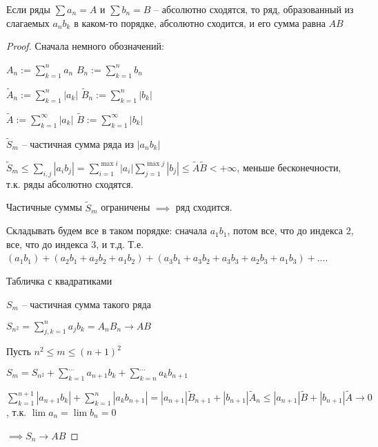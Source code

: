 \begin{theorem}[Коши] \thmslashn
	
	Если ряды $\sum a_n = A$ и $\sum b_n = B$ -- абсолютно сходятся, то ряд, образованный из слагаемых $a_nb_k$ в каком-то порядке, абсолютно сходится, и его сумма равна $AB$
\end{theorem}

\begin{proof} \thmslashn
	
	Сначала немного обозначений:

	$A_n := \sum\limits_{k = 1}^{n} a_n$ $B_n:= \sum\limits_{k=1}^{n}b_n$
	
	$\tilde{A}_n := \sum\limits_{k = 1}^{n}\left|a_k\right|$ $\tilde{B}_n := \sum\limits_{k=1}^{n}\left|b_k\right|$
	
	$\tilde{A} := \sum\limits_{k = 1}^{\infty}\left|a_k\right|$ $\tilde{B} := \sum\limits_{k=1}^{\infty}\left|b_k\right|$
	
	
	$\tilde{S}_m$ -- частичная сумма ряда из $\left|a_nb_k\right|$
	
	$\tilde{S}_m \le \sum\limits_{i, j} \left|a_ib_j\right| = \sum\limits_{i = 1}^{\max{i}}\left|a_i\right|\sum\limits_{j = 1}^{\max{j}}\left|b_j\right| \le \tilde{A}\tilde{B} < +\infty$, меньше бесконечности, т.к. ряды абсолютно сходятся.
	
	Частичные суммы $\tilde{S}_m$ ограничены $\implies $ ряд сходится.
	
	Складывать будем все в таком порядке: сначала $a_1b_1$, потом все, что до индекса $2$, все, что до индекса $3$, и т.д. Т.е. $(a_1b_1) + (a_2b_1 + a_2b_2 + a_1b_2) + (a_3b_1 + a_3b_2 + a_3b_3 + a_2b_3 + a_1b_3) + ...$.
	
	\TODO Табличка с квадратиками 
	
	$S_m$ -- частичная сумма такого ряда
	
	$S_{n^2} = \sum\limits_{j,k=1}^{n} a_j b_k = A_n B_n \to AB$
	
	Пусть $n^2 \le m \le (n+1)^2$
	
	$S_m = S_{n^2} + \sum\limits_{k=1}^{...}a_{n+1}b_k + \sum\limits_{k = n}^{...}a_kb_{n+1}$
	
	$\sum\limits_{k=1}^{n+1}\left|a_{n+1}b_k\right| + \sum\limits_{k=1}^{n}\left|a_kb_{n+1}\right| = \left|a_{n+1}\right|\tilde{B}_{n+1} + \left|b_{n+1}\right|\tilde{A}_{n} \le \left|a_{n+1}\right|\tilde{B} + \left|b_{n+1}\right|\tilde{A} \to 0$, т.к. $\lim a_n = \lim b_n = 0$
	
	$\implies S_n \to AB$
\end{proof}

